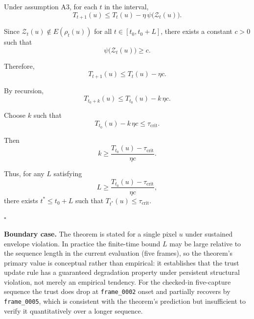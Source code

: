\documentclass[11pt]{article}
\theoremstyle{definition}
\theoremstyle{plain}
\newenvironment{remarkbox}{%
  \begin{tcolorbox}[colback=blue!4,colframe=black!30,boxrule=0.4pt,%
    left=4pt,right=4pt,top=3pt,bottom=3pt,parbox=false]%
}{%
  \end{tcolorbox}%
}
\begin{document}
Under assumption A3, for each $t$ in the interval,
\begin{equation}
T_{t+1}(u)\le T_t(u) - \eta\,\psi\!\bigl(\mathcal{Z}_t(u)\bigr).
\end{equation}

Since $\mathcal{Z}_t(u)\notin E(\rho_t(u))$ for all $t\in[t_0,t_0+L]$, there exists a constant $c>0$ such that
\begin{equation}
\psi\!\bigl(\mathcal{Z}_t(u)\bigr)\ge c.
\end{equation}

Therefore,
\begin{equation}
T_{t+1}(u)\le T_t(u) - \eta c.
\end{equation}

By recursion,
\begin{equation}
T_{t_0+k}(u)\le T_{t_0}(u) - k\,\eta c.
\end{equation}

Choose $k$ such that
\begin{equation}
T_{t_0}(u) - k\,\eta c \le \tau_{\mathrm{crit}}.
\end{equation}

Then
\begin{equation}
k \ge \frac{T_{t_0}(u)-\tau_{\mathrm{crit}}}{\eta c}.
\end{equation}

Thus, for any $L$ satisfying
\begin{equation}
L \ge \frac{T_{t_0}(u)-\tau_{\mathrm{crit}}}{\eta c},
\end{equation}
there exists $t^\ast\le t_0+L$ such that $T_{t^\ast}(u)\le \tau_{\mathrm{crit}}$.

\hfill $\square$

\begin{remarkbox}
\textbf{Boundary case.}
The theorem is stated for a single pixel $u$ under sustained envelope violation. In practice the finite-time bound $L$ may be large relative to the sequence length in the current evaluation (five frames), so the theorem's primary value is conceptual rather than empirical: it establishes that the trust update rule has a guaranteed degradation property under persistent structural violation, not merely an empirical tendency. For the checked-in five-capture sequence the trust does drop at \texttt{frame\_0002} onset and partially recovers by \texttt{frame\_0005}, which is consistent with the theorem's prediction but insufficient to verify it quantitatively over a longer sequence.
\end{remarkbox}
\end{document}
